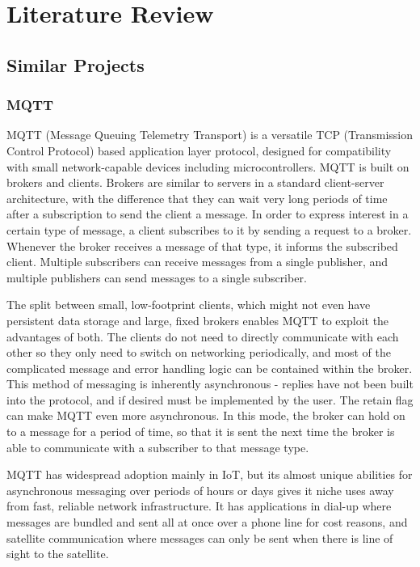\documentclass{article}
\begin{document}
\section{Literature Review}
\subsection{Similar Projects}
\subsubsection{MQTT}
MQTT (Message Queuing Telemetry Transport) is a versatile TCP (Transmission Control Protocol) based application layer protocol, designed for compatibility with small network-capable devices including microcontrollers. MQTT is built on brokers and clients. Brokers are similar to servers in a standard client-server architecture, with the difference that they can wait very long periods of time after a subscription to send the client a message. In order to express interest in a certain type of message, a client subscribes to it by sending a request to a broker. Whenever the broker receives a message of that type, it informs the subscribed client. Multiple subscribers can receive messages from a single publisher, and multiple publishers can send messages to a single subscriber.

The split between small, low-footprint clients, which might not even have persistent data storage and large, fixed brokers enables MQTT to exploit the advantages of both. The clients do not need to directly communicate with each other so they only need to switch on networking periodically, and most of the complicated message and error handling logic can be contained within the broker. This method of messaging is inherently asynchronous - replies have not been built into the protocol, and if desired must be implemented by the user. The retain flag can make MQTT even more asynchronous. In this mode, the broker can hold on to a message for a period of time, so that it is sent the next time the broker is able to communicate with a subscriber to that message type. 

MQTT has widespread adoption mainly in IoT, but its almost unique abilities for asynchronous messaging over periods of hours or days gives it niche uses away from fast, reliable network infrastructure. It has applications in dial-up where messages are bundled and sent all at once over a phone line for cost reasons, and satellite communication where messages can only be sent when there is line of sight to the satellite.
\end{document}
